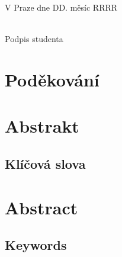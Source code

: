\vspace{2cm}
\noindent
V Praze dne DD. měsíc RRRR
\hfill%
\begin{minipage}[t]{.5\textwidth}%
\begin{center}
\dotfill\\
Podpis studenta
\end{center}
\end{minipage}
\vspace{1cm}

\openright
\vspace*{\fill}
\section*{Poděkování}
\noindent
\Podekovani
\vspace{1cm}


\openright
\section*{Abstrakt}
\noindent
\Abstrakt
\subsection*{Klíčová slova}
\noindent
\KlicovaSlova

\bigskip\bigskip\bigskip
\section*{Abstract}
\noindent
\AbstraktEN
\subsection*{Keywords}
\noindent
\KlicovaSlovaEN

\openright
